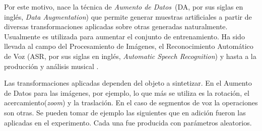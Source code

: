 Por este motivo, nace la t\'ecnica de \emph{Aumento de Datos}~(DA, por sus siglas en ingl\'es, \emph{Data Augmentation}) \cite{imai2005bayesian, hernandez2018data} que permite generar muestras artificiales a partir de diversas transformaciones aplicadas sobre otras generadas naturalmente. Usualmente es utilizada para aumentar el conjunto de entrenamiento. Ha sido llevada al campo del Procesamiento de Im\'agenes, el Reconocimiento Autom\'atico de Voz (ASR, por sus siglas en ingl\'es, \emph{Automatic Speech Recognition}) y hasta a la producci\'on y an\'alisis musical \cite{mcfee2015software, bhardwajaudio}.



Las transformaciones aplicadas dependen del objeto a sintetizar. En el Aumento de Datos para las im\'agenes, por ejemplo, lo que m\'as se utiliza es la rotaci\'on, el acercamiento(\emph{zoom}) y la traslaci\'on\cite{xue2016cnn, kim2020deepcapture}. En el caso de segmentos de voz la operaciones son otras. Se pueden tomar de ejemplo las siguientes que en adici\'on fueron las aplicadas en el experimento. Cada una fue producida con par\'ametros aleatorios.


